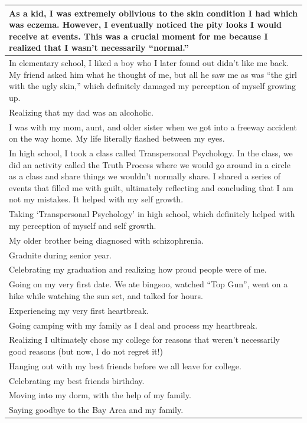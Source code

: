 \documentclass[
  .7em,
  letterpaper,
  DIV=11,
  numbers=noendperiod]{scrartcl}
\begin{document}
\begin{table}
\begin{tabular}{l}
\hline
As a kid, I was extremely oblivious to the skin condition I had which was eczema. However, I eventually noticed the pity looks I would receive at events. This was a crucial moment for me because I realized that I wasn’t necessarily “normal.”\\
\hline
In elementary school, I liked a boy who I later found out didn’t like me back. My friend asked him what he thought of me, but all he saw me as was “the girl with the ugly skin,” which definitely damaged my perception of myself growing up.\\
\hline
Realizing that my dad was an alcoholic.\\
\hline
I was with my mom, aunt, and older sister when we got into a freeway accident on the way home. My life literally flashed between my eyes.\\
\hline
In high school, I took a class called Transpersonal Psychology. In the class, we did an activity called the Truth Process where we would go around in a circle as a class and share things we wouldn’t normally share. I shared a series of events that filled me with guilt, ultimately reflecting and concluding that I am not my mistakes. It helped with my self growth.\\
\hline
Taking ‘Transpersonal Psychology’ in high school, which definitely helped with my perception of myself and self growth.\\
\hline
My older brother being diagnosed with schizophrenia.\\
\hline
Gradnite during senior year.\\
\hline
Celebrating my graduation and realizing how proud people were of me.\\
\hline
Going on my very first date. We ate bingsoo, watched “Top Gun”, went on a hike while watching the sun set, and talked for hours.\\
\hline
Experiencing my very first heartbreak.\\
\hline
Going camping with my family as I deal and process my heartbreak.\\
\hline
Realizing I ultimately chose my college for reasons that weren’t necessarily good reasons (but now, I do not regret it!)\\
\hline
Hanging out with my best friends before we all leave for college.\\
\hline
Celebrating my best friends birthday.\\
\hline
Moving into my dorm, with the help of my family.\\
\hline
Saying goodbye to the Bay Area and my family.\\

\end{tabular}
\end{table}
\end{document}
